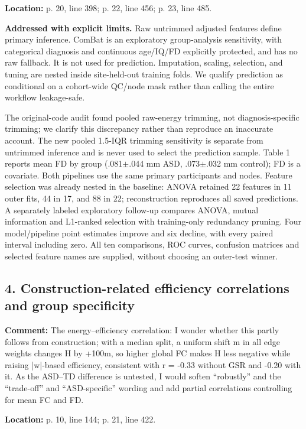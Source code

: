 \documentclass[11pt]{article}
\begin{document}
\textbf{Location:} p. 20, line 398; p. 22, line 456; p. 23, line 485.


 \textbf{Addressed with explicit limits.} Raw untrimmed adjusted features define primary inference. ComBat is an exploratory group-analysis sensitivity, with categorical diagnosis and continuous age/IQ/FD explicitly protected, and has no raw fallback. It is not used for prediction. Imputation, scaling, selection, and tuning are nested inside site-held-out training folds. We qualify prediction as conditional on a cohort-wide QC/node mask rather than calling the entire workflow leakage-safe.


The original-code audit found pooled raw-energy trimming, not diagnosis-specific trimming; we clarify this discrepancy rather than reproduce an inaccurate account. The new pooled 1.5-IQR trimming sensitivity is separate from untrimmed inference and is never used to select the prediction sample. Table 1 reports mean FD by group (.081$\pm$.044 mm ASD, .073$\pm$.032 mm control); FD is a covariate. Both pipelines use the same primary participants and nodes. Feature selection was already nested in the baseline: ANOVA retained 22 features in 11 outer fits, 44 in 17, and 88 in 22; reconstruction reproduces all saved predictions. A separately labeled exploratory follow-up compares ANOVA, mutual information and L1-ranked selection with training-only redundancy pruning. Four model/pipeline point estimates improve and six decline, with every paired interval including zero. All ten comparisons, ROC curves, confusion matrices and selected feature names are supplied, without choosing an outer-test winner.


\subsection*{4. Construction-related efficiency correlations and group specificity}

\textbf{Comment:} The energy--efficiency correlation: I wonder whether this partly follows from construction; with a median split, a uniform shift m in all edge weights changes H by +100m, so higher global FC makes H less negative while raising |w|-based efficiency, consistent with r = -0.33 without GSR and -0.20 with it. As the ASD--TD difference is untested, I would soften “robustly” and the “trade-off” and “ASD-specific” wording and add partial correlations controlling for mean FC and FD.


\textbf{Location:} p. 10, line 144; p. 21, line 422.
\end{document}
